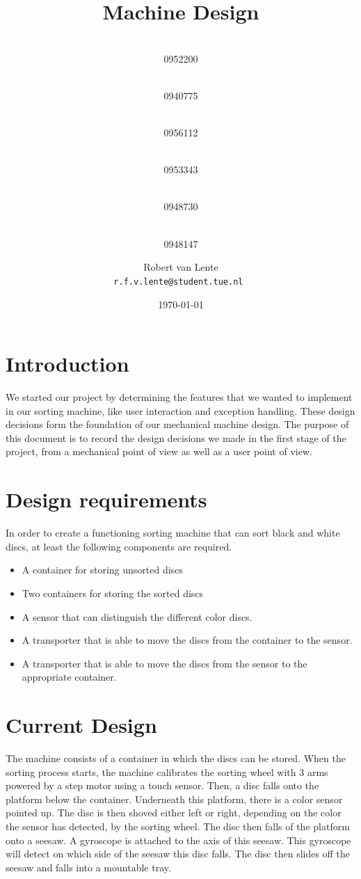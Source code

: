 \documentclass[a4paper,oneside,11pt]{article}
\title{\vspace{-\baselineskip}\sffamily\bfseries Machine Design}
\author{
	\makebox[.25\linewidth]{Sergio van Amerongen}\\0952200 \and
	\makebox[.25\linewidth]{Stefan Cloudt}\\0940775 \and
	\makebox[.25\linewidth]{Daan de Graaf}\\0956112 \and
	\makebox[.25\linewidth]{Robert van Lente}\\0953343 \and
	\makebox[.25\linewidth]{Tom Peters}\\0948730 \and
	\makebox[.25\linewidth]{Berrie Trippe}\\0948147 
	\and \makebox[.75\linewidth]{\textbf{Responsible:}} \and
	Robert van Lente\\ \tt{r.f.v.lente@student.tue.nl}
}
\date{\today}
\begin{document}
\maketitle

\section{Introduction}
We started our project by determining the features that we wanted to implement in our sorting machine, like user interaction and exception handling. These design decisions form the foundation of our mechanical machine design. The purpose of this document is to record the design decisions we made in the first stage of the project, from a mechanical point of view as well as a user point of view.

\section{Design requirements}
In order to create a functioning sorting machine that can sort black and white discs, at least the following components are required.
\begin{itemize}
\item A container for storing unsorted discs
\item Two containers for storing the sorted discs
\item A sensor that can distinguish the different color discs.
\item A transporter that is able to move the discs from the container to the sensor.
\item A transporter that is able to move the discs from the sensor to the appropriate container.
\end{itemize}

\section{Current Design}
The machine consists of a container in which the discs can be stored. When the sorting process starts, the machine calibrates the sorting wheel with 3 arms powered by a step motor using a touch sensor. Then, a disc falls onto the platform below the container. Underneath this platform, there is a color sensor pointed up. The disc is then shoved either left or right, depending on the color the sensor has detected, by the sorting wheel. The disc then falls of the platform onto a seesaw. A gyroscope is attached to the axis of this seesaw. This gyroscope will detect on which side of the seesaw this disc falls. The disc then slides off the seesaw and falls into a mountable tray.
\end{document}
